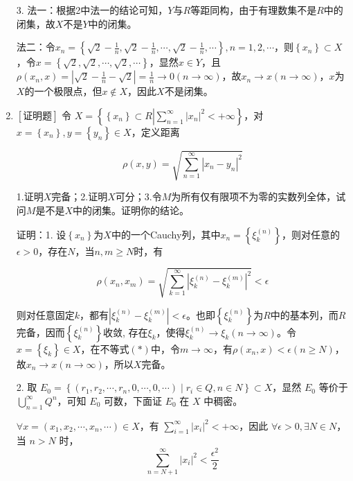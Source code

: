 \documentclass{article}
\begin{document}
\begin{enumerate}
3. 法一：根据2中法一的结论可知，$Y$与$R$等距同构，由于有理数集不是$R$中的闭集，故$X$不是$Y$中的闭集。

法二：令$x_n = \left\{\sqrt{2} - \frac{1}{n}, \sqrt{2} - \frac{1}{n}, \cdots, \sqrt{2} - \frac{1}{n}, \cdots \right\}, n = 1, 2, \cdots$，则$\left\{x_n\right\} \subset X$，令$x = \left\{\sqrt{2}, \sqrt{2}, \cdots, \sqrt{2}, \cdots \right\}$，显然$x \in Y$，且$\rho(x_n, x) = \left| \sqrt{2} - \frac{1}{n} - \sqrt{2}\right| = \frac{1}{n} \to 0 (n \to \infty)$，故$x_n \to x (n \to \infty)$，$x$为$X$的一个极限点，但$x \notin X$，因此$X$不是闭集。

\item $\left[\textbf{证明题}\right]$ 令 $X=\left\{\left\{x_n\right\} \subset R\left|\sum_{n=1}^{\infty}\left| x_n \right|^2 <+\infty \right.\right\}$，对$x=\left\{x_n\right\},y=\left\{y_n\right\} \in X$，定义距离

$$
\rho\left(x, y\right)=\sqrt{\sum_{n=1}^{\infty}{\left|x_n-y_n\right|}^2}
$$

1.证明$X$完备；2.证明$X$可分；3.令$M$为所有仅有限项不为零的实数列全体，试问$M$是不是$X$中的闭集。证明你的结论。

证明：1. 设$\left\{x_n\right\}$为$X$中的一个Cauchy列，其中$x_n=\left\{\xi_k^{(n)}\right\}$，则对任意的$\epsilon > 0$，存在$N$，当$n, m \geq N$时，有

\begin{equation*}
    \rho(x_n, x_m) = \sqrt{\sum_{k=1}^{\infty}{\left| \xi_{k}^{(n)} - \xi_{k}^{(m)} \right|}^2 } < \epsilon \tag{*}    
\end{equation*}

则对任意固定$k$，都有$\left| \xi_{k}^{(n)} - \xi_{k}^{(m)} \right| < \epsilon$。也即$\left\{\xi_k^{(n)}\right\}$为$R$中的基本列，而$R$完备，因而$\left\{\xi_k^{(n)}\right\}$收敛, 存在$\xi_k$，使得$\xi_k^{(n)} \to \xi_k(n \to \infty)$。令$x=\left\{\xi_k\right\} \in X$，在不等式$(*)$中，令$m\to \infty$，有$\rho(x_n, x) < \epsilon (n \geq N)$，故$x_n \to x (n \to \infty)$，所以$X$完备。

2. 取 $E_0=\left\{\left(r_1, r_2, \cdots, r_n, 0, \cdots, 0, \cdots\right) \mid r_i \in Q, n \in N\right\} \subset X$，显然 $E_0$ 等价于 $\bigcup_{n=1}^{\infty} Q^n$，可知 $E_0$ 可数，下面证 $E_0$ 在 $X$ 中稠密。

$\forall x=\left(x_1, x_2, \cdots, x_n, \cdots\right) \in X$，有 $\sum_{i=1}^{\infty}\left|x_i\right|^2<+\infty$，因此 $\forall \epsilon>0, \exists N \in N$，当 $n>N$ 时，
$$
\sum_{n=N+1}^{\infty}\left|x_i\right|^2<\frac{\epsilon^2}{2}
$$


\end{enumerate}
\end{document}
